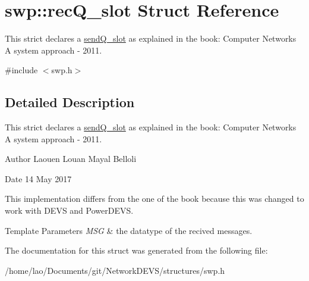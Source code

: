 \hypertarget{structswp_1_1recQ__slot}{}\section{swp\+:\+:rec\+Q\+\_\+slot Struct Reference}
\label{structswp_1_1recQ__slot}


This strict declares a \hyperlink{structswp_1_1sendQ__slot}{send\+Q\+\_\+slot} as explained in the book\+: Computer Networks A system approach -\/ 2011.  




{\ttfamily \#include $<$swp.\+h$>$}



\subsection{Detailed Description}
This strict declares a \hyperlink{structswp_1_1sendQ__slot}{send\+Q\+\_\+slot} as explained in the book\+: Computer Networks A system approach -\/ 2011. 

\begin{DoxyAuthor}{Author}
Laouen Louan Mayal Belloli 
\end{DoxyAuthor}
\begin{DoxyDate}{Date}
14 May 2017
\end{DoxyDate}
This implementation differs from the one of the book because this was changed to work with D\+E\+VS and Power\+D\+E\+VS.


\begin{DoxyTemplParams}{Template Parameters}
{\em M\+SG} & the datatype of the recived messages. \\
\hline
\end{DoxyTemplParams}


The documentation for this struct was generated from the following file\+:\begin{DoxyCompactItemize}
\item 
/home/lao/\+Documents/git/\+Network\+D\+E\+V\+S/structures/swp.\+h\end{DoxyCompactItemize}
